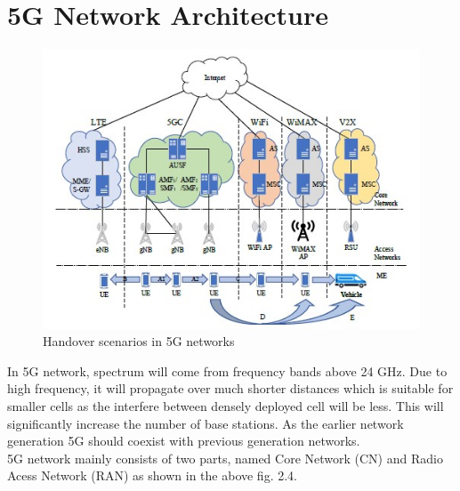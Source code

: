 \section{5G Network Architecture}
{
    \begin{figure}[h]
        \centering
        \includegraphics[scale=0.7]{img/5g-arch.jpg}
        \caption{Handover scenarios in 5G networks}
    \end{figure}
    In 5G network, spectrum will come from frequency bands above 24 GHz. Due to high 
    frequency, it will propagate over much shorter distances which is suitable 
    for smaller cells as the interfere between densely deployed cell will be less. This will
    significantly increase the number of base stations. As the earlier network generation
    5G should coexist with previous generation networks.\\ 
    5G network mainly consists of two parts, named Core Network (CN) and Radio Acess 
    Network (RAN) as shown in the above fig. 2.4. 


}
